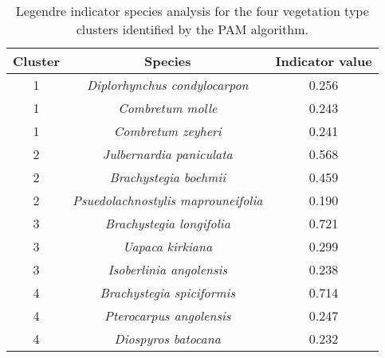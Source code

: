 \begin{table}[h]
\centering
\begin{tabular}{ccc}
  \hline
Cluster & Species & Indicator value \\ 
  \hline
1 & \textit{Diplorhynchus condylocarpon} & 0.256 \\ 
  1 & \textit{Combretum molle} & 0.243 \\ 
  1 & \textit{Combretum zeyheri} & 0.241 \\ 
   \hline
2 & \textit{Julbernardia paniculata} & 0.568 \\ 
  2 & \textit{Brachystegia boehmii} & 0.459 \\ 
  2 & \textit{Psuedolachnostylis maprouneifolia} & 0.190 \\ 
   \hline
3 & \textit{Brachystegia longifolia} & 0.721 \\ 
  3 & \textit{Uapaca kirkiana} & 0.299 \\ 
  3 & \textit{Isoberlinia angolensis} & 0.238 \\ 
   \hline
4 & \textit{Brachystegia spiciformis} & 0.714 \\ 
  4 & \textit{Pterocarpus angolensis} & 0.247 \\ 
  4 & \textit{Diospyros batocana} & 0.232 \\ 
   \hline
\end{tabular}
\caption{Legendre indicator species analysis for the four vegetation type clusters identified by the PAM algorithm.} 
\label{indval}
\end{table}


